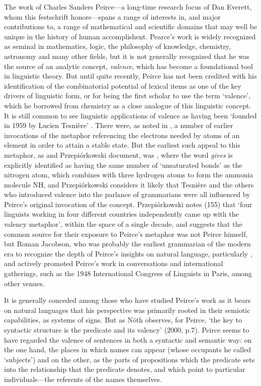 \documentclass[output=paper,colorlinks,citecolor=brown]{langscibook}
\begin{document}
The work of Charles Sanders Peirce---a long-time research focus of Dan
Everett, whom this festschrift honors---spans a range of interests in,
and major contributions to, a range of mathematical and scientific
domains that may well be unique in the history of human
accomplishent. Pearce's work is widely recognized as seminal in
mathematics, logic, the philosophy of knowledge, chemistry, astronomy
and many other fields, but it is not generally recognized that he was
the source of an analytic concept, \textsl{valence}, which has become
a foundational tool in linguistic theory. But until quite recently,
Peirce has not been credited with his identification of the
combinatorial potential of lexical items as one of the key drivers of
linguistic form, or for being the first scholar to use the term
`valence', which he borrowed from chemistry as a close analogue of
this linguistic concept. It is still common to see linguistic
applications of valence as having been `founded in 1959 by Lucien
Tesnière' \citet{hollein2022}. There were, as noted in \citet{AdamP-Peirce}, a
number of earlier invocations of the metaphor referencing the
electrons needed by atoms of an element in order to attain a stable
state. But the earliest such appeal to this metaphor, as \citet{askedal91}
and Przepi\'{o}rkowski document, was \citet{peirce1897}, where the word
\textit{gives} is explicitly identified as having the same number of
`unsaturated bonds' as the nitrogen atom, which combines with three
hydrogen atoms to form the ammonia molecule NH, and
Przepi{\'o}rkowski considers it likely that Tesnière and the
others who introduced valence into the parlance of grammarians were
all influenced by Peirce's original invocation of the
concept. Przepi{\'o}rkowski notes (155) that `four linguists working
in four different countries independently came up with the valency
metaphor', within the space of a single decade, and suggests that the
common source for their exposure to Peirce's metaphor was not Peirce
himself, but Roman Jacobson, who was probably the earliest
grammarian of the modern era to recognize the depth of Peirce's
insights on natural language, particularly \citet{peirce1897}, and actively
promoted Peirce's work in conversations and international gatherings,
such as the 1948 International Congress of Linguists in Paris, among
other venues.  

It is generally conceded among those who have studied Peirce's work as
it bears on natural languages that his perspective was primarily
rooted in their semiotic capabilities, as systems of signs. But as
Nöth observes, for Peirce, `the key to syntactic structure is the
predicate and its valency' (2000, p.7)\nocite{nothPeirce}. Peirce
seems to have regarded the valence of sentences in both a syntactic
and semantic way: on the one hand, the places in which names can
appear (whose occupants he called `subjects') and on the other, as the
parts of propositions which the predicate sets into the relationship
that the predicate denotes, and which point to particular
individuals---the referents of the names themselves.
\end{document}

